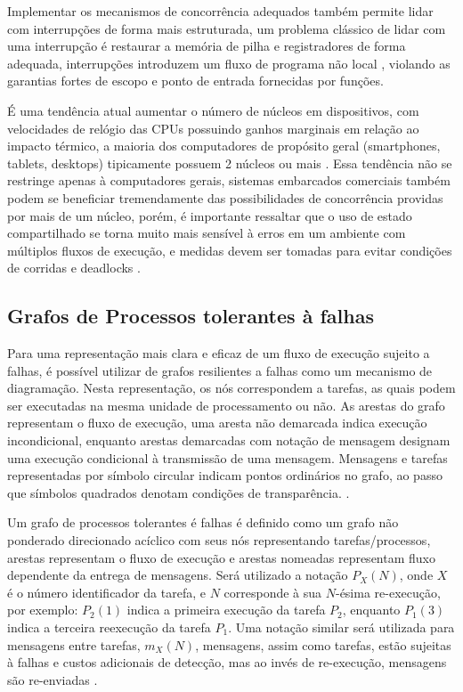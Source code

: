 Implementar os mecanismos de concorrência adequados também permite lidar com interrupções de forma mais estruturada, um problema clássico de lidar com uma interrupção é restaurar a memória de pilha e registradores de forma adequada, interrupções introduzem um fluxo de programa não local
, violando as garantias fortes de escopo e ponto de entrada fornecidas por funções.

É uma tendência atual aumentar o número de núcleos em dispositivos, com velocidades de relógio das CPUs possuindo ganhos marginais em relação ao impacto térmico, a maioria dos computadores de propósito geral (smartphones, tablets, desktops) tipicamente possuem 2 núcleos ou mais \cite{ComputerOrganizationAndDesign}. Essa tendência não se restringe apenas à computadores gerais, sistemas embarcados comerciais também podem se beneficiar tremendamente das possibilidades de concorrência providas por mais de um núcleo, porém, é importante ressaltar que o uso de estado compartilhado se torna muito mais sensível à erros em um ambiente com múltiplos fluxos de execução, e medidas devem ser tomadas para evitar condições de corridas e deadlocks \cite{OperatingSystemConcepts}.

\subsection{Grafos de Processos tolerantes à falhas}

Para uma representação mais clara e eficaz de um fluxo de execução sujeito a falhas, é possível utilizar de grafos resilientes a falhas como um mecanismo de diagramação. Nesta representação, os nós correspondem a tarefas, as quais podem ser executadas na mesma unidade de processamento ou não. As arestas do grafo representam o fluxo de execução, uma aresta não demarcada indica execução incondicional, enquanto arestas demarcadas com notação de mensagem designam uma execução condicional à transmissão de uma mensagem. Mensagens e tarefas representadas por símbolo circular indicam pontos ordinários no grafo, ao passo que símbolos quadrados denotam condições de transparência. \cite{SchedAndOptOfDistributedFT}.

Um grafo de processos tolerantes é falhas é definido como um grafo não ponderado direcionado acíclico com seus nós representando tarefas/processos, arestas representam o fluxo de execução e arestas nomeadas representam fluxo dependente da entrega de mensagens. Será utilizado a notação $P_X (N)$, onde $X$ é o número identificador da tarefa, e $N$ corresponde à sua $N$-ésima re-execução, por exemplo: $P_2 (1)$ indica a primeira execução da tarefa $P_2$, enquanto $P_1 (3)$ indica a terceira reexecução da tarefa $P_1$. Uma notação similar será utilizada para mensagens entre tarefas, $m_X (N)$, mensagens, assim como tarefas, estão sujeitas à falhas e custos adicionais de detecção, mas ao invés de re-execução, mensagens são re-enviadas \cite{SchedFTWithSoftAndHardConstraints}.

